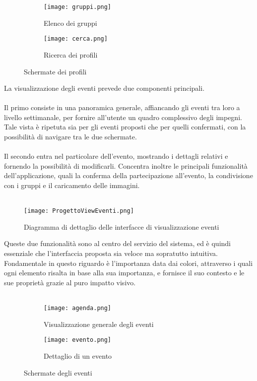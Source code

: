 \begin{figure}[htbp]
    \centering
    \begin{subfigure}{0.49\textwidth}
        \centering
        \texttt{[image: gruppi.png]}
        \caption{Elenco dei gruppi}
    \end{subfigure}
    \hfill
    \begin{subfigure}{0.49\textwidth}
        \centering
        \texttt{[image: cerca.png]}
        \caption{Ricerca dei profili}
    \end{subfigure}
    \caption{Schermate dei profili}
\end{figure}

La visualizzazione degli eventi prevede due componenti principali.\\
\\
Il primo consiste in una panoramica generale,
affiancando gli eventi tra loro a livello settimanale,
per fornire all'utente un quadro complessivo degli impegni.
Tale vista è ripetuta sia per gli eventi proposti che per quelli confermati,
con la possibilità di navigare tra le due schermate.\\
\\
Il secondo entra nel particolare dell'evento,
mostrando i dettagli relativi e fornendo la possibilità di modificarli.
Concentra inoltre le principali funzionalità dell'applicazione,
quali la conferma della partecipazione all'evento,
la condivisione con i gruppi e il caricamento delle immagini.\\
\\
\begin{figure}[h!]
    \begin{center}
        \texttt{[image: ProgettoViewEventi.png]}
        \caption{Diagramma di dettaglio delle interfacce di visualizzazione eventi}
    \end{center}
\end{figure}

Queste due funzionalità sono al centro del servizio del sistema,
ed è quindi essenziale che l'interfaccia proposta sia veloce ma sopratutto intuitiva.
Fondamentale in questo riguardo è l'importanza data dai colori, attraverso i quali
ogni elemento risalta in base alla sua importanza, e fornisce il suo contesto e le sue proprietà
grazie al puro impatto visivo.\\
\\



\begin{figure}[htbp]
    \centering
    \begin{subfigure}{0.49\textwidth}
        \centering
        \texttt{[image: agenda.png]}
        \caption{Visualizzazione generale degli eventi}
    \end{subfigure}
    \hfill
    \begin{subfigure}{0.49\textwidth}
        \centering
        \texttt{[image: evento.png]}
        \caption{Dettaglio di un evento}
    \end{subfigure}
    \caption{Schermate degli eventi}
\end{figure}

